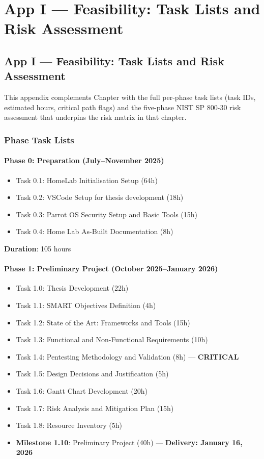 \chapter{App I --- Feasibility: Task Lists and Risk Assessment}

\section{App I --- Feasibility: Task Lists and Risk Assessment}

This appendix complements Chapter with the full per-phase task lists (task IDs, estimated hours, critical path flags) and the five-phase NIST SP 800-30 risk assessment that underpins the risk matrix in that chapter.

\subsection{Phase Task Lists}

\subsubsection{Phase 0: Preparation (July--November 2025)}

\begin{itemize}
\tightlist
\item
  Task 0.1: HomeLab Initialisation Setup (64h)
\item
  Task 0.2: VSCode Setup for thesis development (18h)
\item
  Task 0.3: Parrot OS Security Setup and Basic Tools (15h)
\item
  Task 0.4: Home Lab As-Built Documentation (8h)
\end{itemize}

\textbf{Duration}: 105 hours

\subsubsection{Phase 1: Preliminary Project (October 2025--January 2026)}

\begin{itemize}
\tightlist
\item
  Task 1.0: Thesis Development (22h)
\item
  Task 1.1: SMART Objectives Definition (4h)
\item
  Task 1.2: State of the Art: Frameworks and Tools (15h)
\item
  Task 1.3: Functional and Non-Functional Requirements (10h)
\item
  Task 1.4: Pentesting Methodology and Validation (8h) --- \textbf{CRITICAL}
\item
  Task 1.5: Design Decisions and Justification (5h)
\item
  Task 1.6: Gantt Chart Development (20h)
\item
  Task 1.7: Risk Analysis and Mitigation Plan (15h)
\item
  Task 1.8: Resource Inventory (5h)
\item
  \textbf{Milestone 1.10}: Preliminary Project (40h) --- \textbf{Delivery: January 16, 2026}
\end{itemize}

